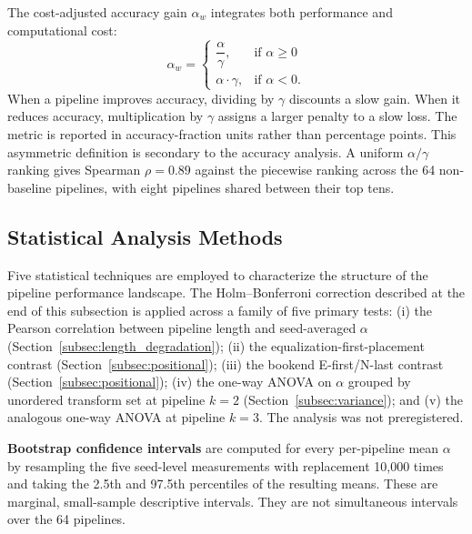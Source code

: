 \documentclass[preprint,review,12pt]{elsarticle}
\begin{document}
The cost-adjusted accuracy gain $\alpha_w$ integrates both performance and computational cost:
\begin{equation}
\alpha_w =
\begin{cases}
\dfrac{\alpha}{\gamma}, & \text{if } \alpha \geq 0 \\[0.4em]
\alpha \cdot \gamma, & \text{if } \alpha < 0.
\end{cases}
\label{eq:alpha_w}
\end{equation}
When a pipeline improves accuracy, dividing by $\gamma$ discounts a slow gain. When it reduces accuracy, multiplication by $\gamma$ assigns a larger penalty to a slow loss. The metric is reported in accuracy-fraction units rather than percentage points. This asymmetric definition is secondary to the accuracy analysis. A uniform $\alpha/\gamma$ ranking gives Spearman $\rho=0.89$ against the piecewise ranking across the 64 non-baseline pipelines, with eight pipelines shared between their top tens.

\subsection{Statistical Analysis Methods}
\label{subsec:stats}

Five statistical techniques are employed to characterize the structure of the pipeline performance landscape. The Holm--Bonferroni correction described at the end of this subsection is applied across a family of five primary tests: (i) the Pearson correlation between pipeline length and seed-averaged $\alpha$ (Section~\ref{subsec:length_degradation}); (ii) the equalization-first-placement contrast (Section~\ref{subsec:positional}); (iii) the bookend E-first/N-last contrast (Section~\ref{subsec:positional}); (iv) the one-way ANOVA on $\alpha$ grouped by unordered transform set at pipeline $k=2$ (Section~\ref{subsec:variance}); and (v) the analogous one-way ANOVA at pipeline $k=3$. The analysis was not preregistered.

\textbf{Bootstrap confidence intervals} are computed for every per-pipeline mean $\alpha$ by resampling the five seed-level measurements with replacement 10{,}000 times and taking the 2.5th and 97.5th percentiles of the resulting means. These are marginal, small-sample descriptive intervals. They are not simultaneous intervals over the 64 pipelines.
\end{document}
